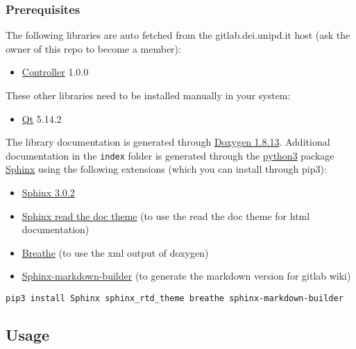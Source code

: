 \hypertarget{prerequisites}{%
\subsubsection{Prerequisites}\label{prerequisites}}

The following libraries are auto fetched from the gitlab.dei.unipd.it
host (ask the owner of this repo to become a member):

\begin{itemize}
\tightlist
\item
  \href{https://gitlab.dei.unipd.it/PAT/Controller.git}{Controller}
  1.0.0
\end{itemize}

These other libraries need to be installed manually in your system:

\begin{itemize}
\tightlist
\item
  \href{https://www.qt.io/}{Qt} 5.14.2
\end{itemize}

The library documentation is generated through
\href{http://www.doxygen.nl/download.html}{Doxygen 1.8.13}. Additional
documentation in the \texttt{index} folder is generated through the
\href{https://www.anaconda.com/products/individual}{python3} package
\href{https://www.sphinx-doc.org/en/master/}{Sphinx} using the following
extensions (which you can install through pip3):

\begin{itemize}
\tightlist
\item
  \href{https://pypi.org/project/Sphinx/}{Sphinx 3.0.2}
\item
  \href{https://sphinx-rtd-theme.readthedocs.io/en/stable/}{Sphinx read
  the doc theme} (to use the read the doc theme for html documentation)
\item
  \href{https://pypi.org/project/breathe/}{Breathe} (to use the xml
  output of doxygen)
\item
  \href{https://pypi.org/project/sphinx-markdown-builder/}{Sphinx-markdown-builder}
  (to generate the markdown version for gitlab wiki)
\end{itemize}

\texttt{pip3\ install\ Sphinx\ sphinx\_rtd\_theme\ breathe\ sphinx-markdown-builder}

\hypertarget{usage}{%
\subsection{Usage}\label{usage}}

